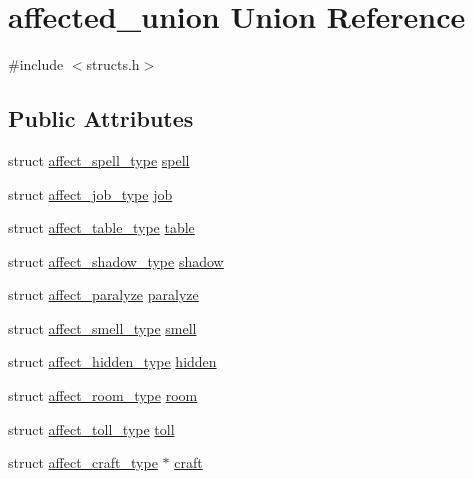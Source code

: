 \hypertarget{unionaffected__union}{\section{affected\-\_\-union Union Reference}
\label{unionaffected__union}
}


{\ttfamily \#include $<$structs.\-h$>$}

\subsection*{Public Attributes}
\begin{DoxyCompactItemize}
\item 
struct \hyperlink{structaffect__spell__type}{affect\-\_\-spell\-\_\-type} \hyperlink{unionaffected__union_abc69e41b5a0c0862865995786229f28c}{spell}
\item 
struct \hyperlink{structaffect__job__type}{affect\-\_\-job\-\_\-type} \hyperlink{unionaffected__union_a3fe2836525837d34ceeb03f2318020d4}{job}
\item 
struct \hyperlink{structaffect__table__type}{affect\-\_\-table\-\_\-type} \hyperlink{unionaffected__union_a2c380a11438c35d00530f5b4b1ad85b2}{table}
\item 
struct \hyperlink{structaffect__shadow__type}{affect\-\_\-shadow\-\_\-type} \hyperlink{unionaffected__union_a897dfa51b71113ca548535de1b524f41}{shadow}
\item 
struct \hyperlink{structaffect__paralyze}{affect\-\_\-paralyze} \hyperlink{unionaffected__union_aead85b240b8970351cf54106b39cc4ce}{paralyze}
\item 
struct \hyperlink{structaffect__smell__type}{affect\-\_\-smell\-\_\-type} \hyperlink{unionaffected__union_ae141f4b53190ba959fbb62baa1ef8156}{smell}
\item 
struct \hyperlink{structaffect__hidden__type}{affect\-\_\-hidden\-\_\-type} \hyperlink{unionaffected__union_ac60c7e40bd2558de2b035e6bda794571}{hidden}
\item 
struct \hyperlink{structaffect__room__type}{affect\-\_\-room\-\_\-type} \hyperlink{unionaffected__union_aa7f04e0b35d76e5783d10369d6f607d7}{room}
\item 
struct \hyperlink{structaffect__toll__type}{affect\-\_\-toll\-\_\-type} \hyperlink{unionaffected__union_a48d27b254d038db067fffab88abc9ac5}{toll}
\item 
struct \hyperlink{structaffect__craft__type}{affect\-\_\-craft\-\_\-type} $\ast$ \hyperlink{unionaffected__union_a0d3cb515a6284521abc165642308d329}{craft}

\end{DoxyCompactItemize}
